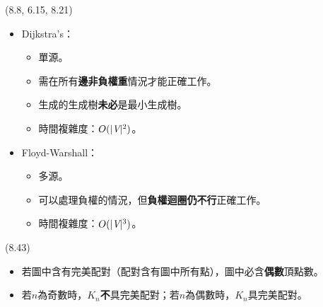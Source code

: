 \item \begin{theorem}{(8.8, 6.15, 8.21)} \quad\quad
    \begin{itemize}
        \item Dijkstra's：\begin{itemize}
            \item 單源。
            \item 需在所有\textbf{邊非負權重}情況才能正確工作。
            \item 生成的生成樹\textbf{未必}是最小生成樹。
            \item 時間複雜度：$O(|\textit{V}|^2)$。
        \end{itemize}
        \item Floyd-Warshall：\begin{itemize}
            \item 多源。
            \item 可以處理負權的情況，但\textbf{負權迴圈仍不行}正確工作。
            \item 時間複雜度：$O(|\textit{V}|^3)$。
        \end{itemize}
    \end{itemize}
\end{theorem}

\item \begin{theorem}{(8.43)} \quad\quad
    \begin{itemize}
        \item 若圖中含有完美配對（配對含有圖中所有點），圖中必含\textbf{偶數}頂點數。
        \item 若$n$為奇數時，$K_n$\textbf{不}具完美配對；若$n$為偶數時，$K_n$具完美配對。
    \end{itemize}
\end{theorem}